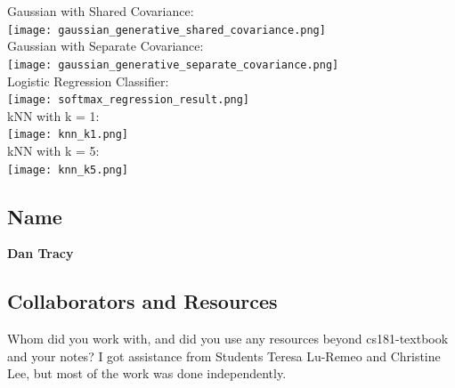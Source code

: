 \documentclass[submit]{harvardml}
\begin{document}
\begin{center}
  Gaussian with Shared Covariance: \\
  \texttt{[image: gaussian\_generative\_shared\_covariance.png]} \\

  Gaussian with Separate Covariance: \\ 
  \texttt{[image: gaussian\_generative\_separate\_covariance.png]} \\

  Logistic Regression Classifier: \\
  \texttt{[image: softmax\_regression\_result.png]} \\

  

  kNN with k = 1: \\
  \texttt{[image: knn\_k1.png]} \\

  kNN with k = 5: \\
  \texttt{[image: knn\_k5.png]} \\




\end{center}

\subsection*{Name}
\textbf{Dan Tracy}
\subsection*{Collaborators and Resources}
Whom did you work with, and did you use any resources beyond cs181-textbook and your notes?
I got assistance from Students Teresa Lu-Remeo and Christine Lee, but most of the work was done independently. 
\end{document}
